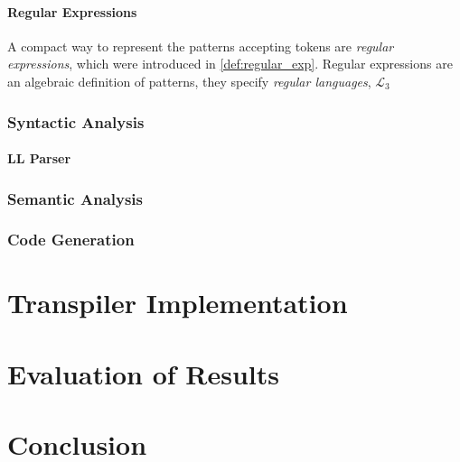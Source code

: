 

\subsubsection*{Regular Expressions}
A compact way to represent the patterns accepting tokens are \emph{regular expressions}, which were introduced in \cref{def:regular_exp}. Regular expressions are an algebraic definition of patterns, they specify \emph{regular languages}, $\mathcal{L}_3$

\subsection*{Syntactic Analysis}

\subsubsection*{LL Parser}

\subsection*{Semantic Analysis}

\subsection*{Code Generation}


\chapter{Transpiler Implementation}


\chapter{Evaluation of Results}
\chapter{Conclusion}





% 
